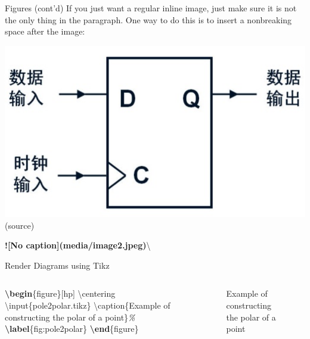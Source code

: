 \documentclass[
  10pt,
  ignorenonframetext,
  serif,onlymath]{beamer}
\newenvironment{Shaded}{}{}
\newcommand{\AlertTok}[1]{\textcolor[rgb]{1.00,0.00,0.00}{\textbf{#1}}}
\newcommand{\CommentTok}[1]{\textcolor[rgb]{0.38,0.63,0.69}{\textit{#1}}}
\newcommand{\ExtensionTok}[1]{#1}
\newcommand{\FunctionTok}[1]{\textcolor[rgb]{0.02,0.16,0.49}{#1}}
\newcommand{\KeywordTok}[1]{\textcolor[rgb]{0.00,0.44,0.13}{\textbf{#1}}}
\newcommand{\NormalTok}[1]{#1}
\begin{document}
\begin{frame}[fragile]{Figures (cont'd)}
\protect\hypertarget{sec:figures-contd}{}
If you just want a regular inline image, just make sure it is not the
only thing in the paragraph. One way to do this is to insert a
nonbreaking space after the image:

\includegraphics{media/image2.jpeg}\\

(source)

\begin{Shaded}
\begin{Highlighting}[]
\AlertTok{![No caption](media/image2.jpeg)}\NormalTok{\textbackslash{}}
\end{Highlighting}
\end{Shaded}
\end{frame}

\begin{frame}[fragile]{Render Diagrams using Tikz}
\protect\hypertarget{sec:render-diagrams-using-tikz}{}
\begin{columns}

\scriptsize

\begin{Shaded}
\begin{Highlighting}[]
\KeywordTok{\textbackslash{}begin}\NormalTok{\{}\ExtensionTok{figure}\NormalTok{\}[hp]}
\FunctionTok{\textbackslash{}centering}
\FunctionTok{\textbackslash{}input}\NormalTok{\{pole2polar.tikz\}}
\FunctionTok{\textbackslash{}caption}\NormalTok{\{Example of constructing}
\NormalTok{    the polar of a point\}}\CommentTok{\%}
\KeywordTok{\textbackslash{}label}\NormalTok{\{}\ExtensionTok{fig:pole2polar}\NormalTok{\}}
\KeywordTok{\textbackslash{}end}\NormalTok{\{}\ExtensionTok{figure}\NormalTok{\}}
\end{Highlighting}
\end{Shaded}


\begin{figure}[hp]
\centering

\caption{Example of constructing
    the polar of a point}%
\label{fig:pole2polar}
\end{figure}

\end{columns}
\end{frame}
\end{document}
